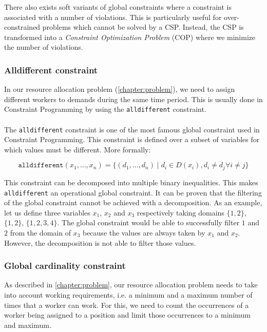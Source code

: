 \documentclass[../../thesis.tex]{subfiles}
\begin{document}
There also exists soft variants \cite{Regin:2000} of global constraints where a constraint is associated with 
a number of violations. This is particularly useful for over-constrained problems which cannot be solved by a CSP.
Instead, the CSP is transformed into a \emph{Constraint Optimization Problem} (COP) where we minimize the number of violations.
\subsubsection{Alldifferent constraint}
\label{sota:alldifferent}

In our resource allocation problem (\autoref{chapter:problem}), we need to assign different workers to demands during the same time period. 
This is usually done in Constraint Programming by using the \texttt{alldifferent} constraint.

\paragraph{}

The \texttt{alldifferent} constraint \cite{Rgin1994AFA} is one of the most famous global constraint used in Constraint 
Programming.
This constraint is defined over a subset of variables for which values must be different. More formally:

\begin{equation*}
  \texttt{alldifferent}(x_1, \dots, x_n) = \{ (d_1, \dots, d_n) \mid d_i \in D(x_i), d_i \neq d_j \forall i \neq j \}
\end{equation*}

This constraint can be decomposed into multiple binary inequalities. This makes \texttt{alldifferent} an operational global constraint.
It can be proven that the filtering of the global constraint cannot be achieved with a decomposition. As 
an example, let us define three variables $x_1$, $x_2$ and $x_3$ respectively taking domains $\{1,2\}$, $\{1,2\}$, $\{1,2,3,4\}$. 
The global constraint would be able to successfully filter $1$ and $2$ from the domain of 
$x_3$ because the values are always taken by $x_1$ and $x_2$. However, the decomposition is not able to filter those values.


\subsubsection{Global cardinality constraint}
\label{sota:gcc}

As described in \autoref{chapter:problem}, our resource allocation problem needs to take into account working requirements, i.e. a minimum 
and a maximum number of times that a worker can work. For this, we need to count the occurrences of a worker being assigned to a position and 
limit those occurrences to a minimum and maximum. 
\end{document}
